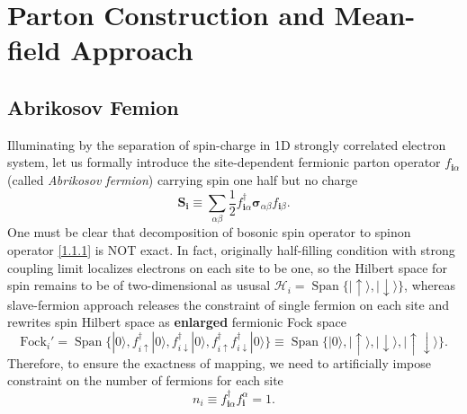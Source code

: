 \documentclass[10pt,nofootinbib]{revtex4}
\begin{document}
\section{Parton Construction and Mean-field Approach}
	\subsection{Abrikosov Femion}
	Illuminating by the separation of spin-charge in 1D strongly correlated electron system, let us formally introduce the site-dependent fermionic parton operator $f_{\bm{i}\alpha}$ (called \emph{Abrikosov fermion}) carrying spin one half but no charge
	\begin{equation}\label{1.1.1}
		\bm{S}_{\bm{i}}\equiv\sum_{\alpha \beta}\dfrac{1}{2}f_{\bm{i}\alpha}^\dagger\bm{\sigma}_{\alpha \beta}f_{\bm{i}\beta}.
	\end{equation}
	One must be clear that decomposition of bosonic spin operator to spinon operator \eqref{1.1.1} is NOT exact. In fact, originally half-filling condition with strong coupling limit localizes electrons on each site to be one, so the Hilbert space for spin remains to be of two-dimensional as ususal $\mathcal{H}_i=\mathop{\mathrm{Span}}\{|\uparrow\rangle,|\downarrow\rangle\}$, whereas slave-fermion approach releases the constraint of single fermion on each site and rewrites spin Hilbert space as \textbf{enlarged} fermionic Fock space
	\begin{equation*}
		\mathrm{Fock}_i'=\mathop{\mathrm{Span}}\{|0\rangle,f_{i\uparrow}^\dagger|0\rangle,f_{i\downarrow}^\dagger|0\rangle,f_{i\uparrow}^\dagger f_{i\downarrow}^\dagger|0\rangle\}\equiv\mathop{\mathrm{Span}}\{|0\rangle,|\uparrow\rangle,|\downarrow\rangle,|\uparrow\downarrow\rangle\}.
	\end{equation*}
	Therefore, to ensure the exactness of mapping, we need to artificially impose constraint on the number of fermions for each site
	\begin{equation}\label{1.1.2}
		n_i\equiv f_{\bm{i} \alpha}^\dagger f_{\bm{i}}^\alpha=1.
	\end{equation}
	
\end{document}
